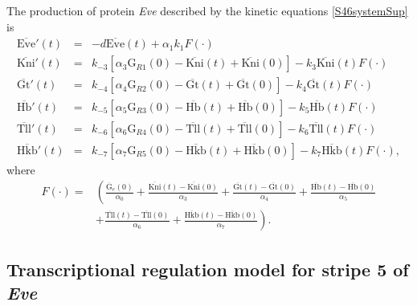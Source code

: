 \documentclass[final,authoryear, 5p, times]{elsarticle}
\begin{document}
The production of protein \textit{Eve} described by the kinetic equations \eqref{S46systemSup} is
$$
\begin{array}{lcl}
    \overline{\text{Eve}}'(t) &= & -d \overline{\text{Eve}}(t) + \alpha _1 k_1 F(\cdot) \\
            \overline{\text{Kni}}'(t)&= &k_{-3} \left[\alpha_3 \text{G}_{R1}(0)-\overline{\text{Kni}}(t)+\overline{\text{Kni}}(0)\right]-k_3 \overline{\text{Kni}}(t) F(\cdot)  \\[5pt]
        \overline{\text{Gt}}'(t)&= & k_{-4} \left[\alpha_4 \text{G}_{R2}(0)-\overline{\text{Gt}}(t)+\overline{\text{Gt}}(0)\right]-k_4 \overline{\text{Gt}}(t) F(\cdot) \\[5pt]
        \overline{\text{Hb}}'(t)&= &k_{-5} \left[\alpha_5 \text{G}_{R3}(0)-\overline{\text{Hb}}(t)+\overline{\text{Hb}}(0)\right]-k_5 \overline{\text{Hb}}(t) F(\cdot) \\[5pt]
       \overline{\text{Tll}}'(t)&=&k_{-6} \left[\alpha_6 \text{G}_{R4}(0)-\overline{\text{Tll}}(t)+\overline{\text{Tll}}(0)\right]-k_6 \overline{\text{Tll}}(t) F(\cdot)\\[5pt]
        \overline{\text{Hkb}}'(t)&=&k_{-7} \left[\alpha_7 \text{G}_{R5}(0)-\overline{\text{Hkb}}(t)+\overline{\text{Hkb}}(0)\right]-k_7 \overline{\text{Hkb}}(t) F(\cdot) ,
\end{array}
$$
where
\scriptsize{$$
\begin{array}{ll}
F(\cdot)=& \left(\frac{\overline{\text{G}}_e(0)}{\alpha_0}+\frac{\overline{\text{Kni}}(t)-\overline{\text{Kni}}(0)}{\alpha_3}+\frac{\overline{\text{Gt}}(t)-\overline{\text{Gt}}(0)}{\alpha_4}+\frac{\overline{\text{Hb}}(t)-\overline{\text{Hb}}(0)}{\alpha_5}\right. \\ &\left.+\frac{\overline{\text{Tll}}(t)-\overline{\text{Tll}}(0)}{\alpha_6}+ \frac{\overline{\text{Hkb}}(t)-\overline{\text{Hkb}}(0)}{\alpha_7}
\right).
\end{array}
$$}

\subsection{Transcriptional regulation model for stripe 5 of \textit{Eve}}
\end{document}
